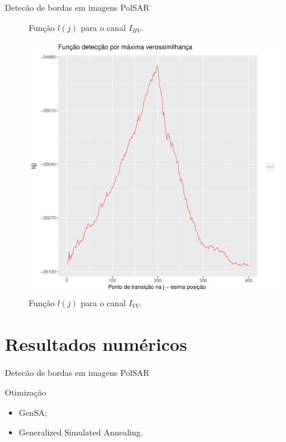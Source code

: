 \documentclass[10pt]{beamer}
\begin{document}
\begin{frame}{Detecão de bordas em imagens PolSAR}
\begin{figure}[hbt]
	\caption{Função $l(j)$ para o canal $I_{HV}$.}\label{cap_acf_fig05}
\endminipage\hfill
{}
  \includegraphics[width=\linewidth]{grafico_l_nhfc_2014_sigmavv.pdf}
	\caption{Função $l(j)$ para o canal $I_{VV}$.}\label{cap_acf_fig06}
\endminipage\hfill
\end{figure}
\end{frame}
\section{Resultados numéricos}
\begin{frame}{Detecão de bordas em imagens PolSAR}
\begin{alertblock}{Otimização}
  \begin{itemize}
\item GenSA;
\item Generalized Simulated Annealing.
\end{itemize}
\end{alertblock}
\end{frame}
\end{document}

